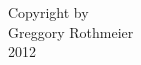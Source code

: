 \thispagestyle{empty}
\begin{center}
  \vspace*{\fill}
  Copyright by\\
  Greggory Rothmeier\\
  2012\\
  \vspace{0.5in}
\end{center}